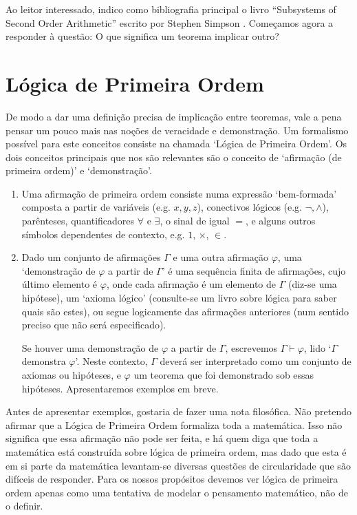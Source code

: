 Ao leitor interessado, indico como bibliografia principal o livro ``Subsystems of Second Order Arithmetic'' escrito por Stephen Simpson \cite{simpson}. Começamos agora a responder à questão: O que significa um teorema implicar outro?

\section*{Lógica de Primeira Ordem}

De modo a dar uma definição precisa de implicação entre teoremas, vale a pena pensar um pouco mais nas noções de veracidade e demonstração. Um formalismo possível para este conceitos consiste na chamada `Lógica de Primeira Ordem'. Os dois conceitos principais que nos são relevantes são o conceito de `afirmação (de primeira ordem)' e `demonstração'.

\begin{enumerate}
\item Uma afirmação de primeira ordem consiste numa expressão `bem-formada' composta a partir de variáveis (e.g. $x,y,z$), conectivos lógicos (e.g. $\neg, \land$), parênteses, quantificadores $\forall$ e $\exists$, o sinal de igual $=$, e alguns outros símbolos dependentes de contexto, e.g. $1$, $\times$, $\in$.

\item Dado um conjunto de afirmações $\Gamma$ e uma outra afirmação $\varphi$, uma `demonstração de $\varphi$ a partir de $\Gamma$' é uma sequência finita de afirmações, cujo último elemento é $\varphi$, onde cada afirmação é um elemento de $\Gamma$ (diz-se uma hipótese), um `axioma lógico' (consulte-se um livro sobre lógica para saber quais são estes), ou segue logicamente das afirmações anteriores (num sentido preciso que não será especificado).

Se houver uma demonstração de $\varphi$ a partir de $\Gamma$, escrevemos $\Gamma \vdash \varphi$, lido `$\Gamma$ demonstra $\varphi$'. Neste contexto, $\Gamma$ deverá ser interpretado como um conjunto de axiomas ou hipóteses, e $\varphi$ um teorema que foi demonstrado sob essas hipóteses. Apresentaremos exemplos em breve.
\end{enumerate}

Antes de apresentar exemplos, gostaria de fazer uma nota filosófica. Não pretendo afirmar que a Lógica de Primeira Ordem formaliza toda a matemática. Isso não significa que essa afirmação não pode ser feita, e há quem diga que toda a matemática está construída sobre lógica de primeira ordem, mas dado que esta é em si parte da matemática levantam-se diversas questões de circularidade que são difíceis de responder. Para os nossos propósitos devemos ver lógica de primeira ordem apenas como uma tentativa de modelar o pensamento matemático, não de o definir.

